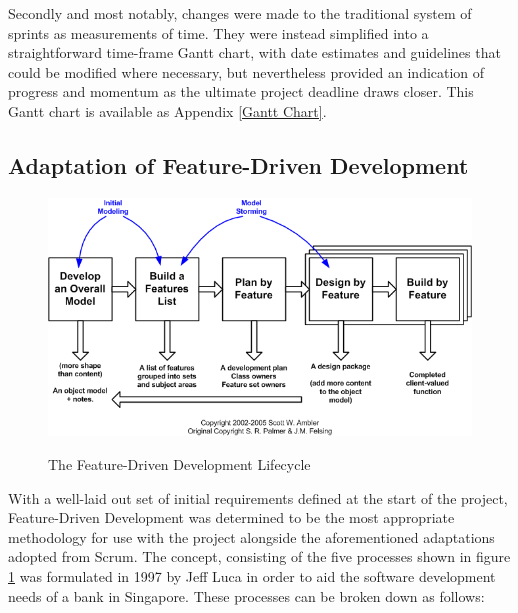 Secondly and most notably, changes were made to the traditional system of sprints as measurements of time. They were instead simplified into a straightforward time-frame Gantt chart, with date estimates and guidelines that could be modified where necessary, but nevertheless provided an indication of progress and momentum as the ultimate project deadline draws closer. This Gantt chart is available as Appendix \ref{Gantt Chart}.

\subsection{Adaptation of Feature-Driven Development}
\begin{figure}[!ht]
    \includegraphics[width=\textwidth]{Figures/fdd}
    \caption{The Feature-Driven Development Lifecycle}
    \label{fig:fdd1} \cite{FDDimage}
\end{figure}

With a well-laid out set of initial requirements defined at the start of the project, Feature-Driven Development was determined to be the most appropriate methodology for use with the project alongside the aforementioned adaptations adopted from Scrum. The concept, consisting of the five processes shown in figure \ref{fig:fdd1} was formulated in 1997 by Jeff Luca in order to aid the software development needs of a bank in Singapore. \cite{Arrk1} These processes can be broken down as follows:

